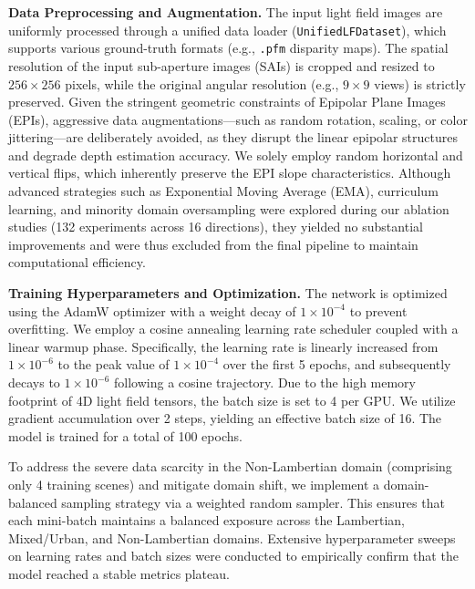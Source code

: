 \documentclass[lettersize,journal]{IEEEtran}
\begin{document}
\textbf{Data Preprocessing and Augmentation.} 
The input light field images are uniformly processed through a unified data loader (\texttt{UnifiedLFDataset}), which supports various ground-truth formats (e.g., \texttt{.pfm} disparity maps). The spatial resolution of the input sub-aperture images (SAIs) is cropped and resized to $256 \times 256$ pixels, while the original angular resolution (e.g., $9 \times 9$ views) is strictly preserved. Given the stringent geometric constraints of Epipolar Plane Images (EPIs), aggressive data augmentations---such as random rotation, scaling, or color jittering---are deliberately avoided, as they disrupt the linear epipolar structures and degrade depth estimation accuracy. We solely employ random horizontal and vertical flips, which inherently preserve the EPI slope characteristics. Although advanced strategies such as Exponential Moving Average (EMA), curriculum learning, and minority domain oversampling were explored during our ablation studies (132 experiments across 16 directions), they yielded no substantial improvements and were thus excluded from the final pipeline to maintain computational efficiency.

\textbf{Training Hyperparameters and Optimization.} 
The network is optimized using the AdamW optimizer with a weight decay of $1 \times 10^{-4}$ to prevent overfitting. We employ a cosine annealing learning rate scheduler coupled with a linear warmup phase. Specifically, the learning rate is linearly increased from $1 \times 10^{-6}$ to the peak value of $1 \times 10^{-4}$ over the first 5 epochs, and subsequently decays to $1 \times 10^{-6}$ following a cosine trajectory. Due to the high memory footprint of 4D light field tensors, the batch size is set to 4 per GPU. We utilize gradient accumulation over 2 steps, yielding an effective batch size of 16. The model is trained for a total of 100 epochs. 

To address the severe data scarcity in the Non-Lambertian domain (comprising only 4 training scenes) and mitigate domain shift, we implement a domain-balanced sampling strategy via a weighted random sampler. This ensures that each mini-batch maintains a balanced exposure across the Lambertian, Mixed/Urban, and Non-Lambertian domains. Extensive hyperparameter sweeps on learning rates and batch sizes were conducted to empirically confirm that the model reached a stable metrics plateau.
\end{document}

